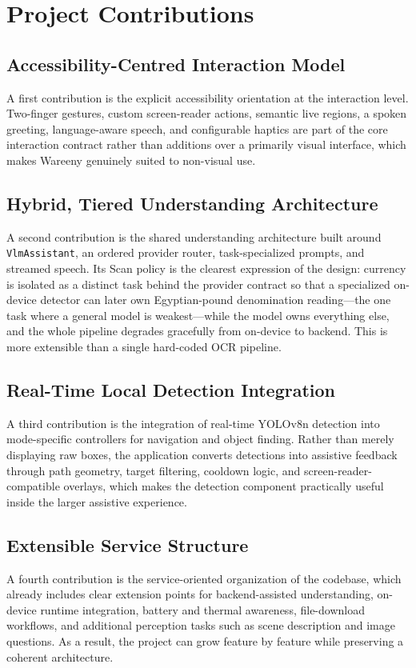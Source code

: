 \documentclass[a4paper]{report}
\begin{document}
\section{Project Contributions}
\subsection{Accessibility-Centred Interaction Model}
A first contribution is the explicit accessibility orientation at the interaction level. Two-finger gestures, custom screen-reader actions, semantic live regions, a spoken greeting, language-aware speech, and configurable haptics are part of the core interaction contract rather than additions over a primarily visual interface, which makes Wareeny genuinely suited to non-visual use.

\subsection{Hybrid, Tiered Understanding Architecture}
A second contribution is the shared understanding architecture built around \texttt{VlmAssistant}, an ordered provider router, task-specialized prompts, and streamed speech. Its Scan policy is the clearest expression of the design: currency is isolated as a distinct task behind the provider contract so that a specialized on-device detector can later own Egyptian-pound denomination reading---the one task where a general model is weakest---while the model owns everything else, and the whole pipeline degrades gracefully from on-device to backend. This is more extensible than a single hard-coded OCR pipeline.

\subsection{Real-Time Local Detection Integration}
A third contribution is the integration of real-time YOLOv8n detection into mode-specific controllers for navigation and object finding. Rather than merely displaying raw boxes, the application converts detections into assistive feedback through path geometry, target filtering, cooldown logic, and screen-reader-compatible overlays, which makes the detection component practically useful inside the larger assistive experience.

\subsection{Extensible Service Structure}
A fourth contribution is the service-oriented organization of the codebase, which already includes clear extension points for backend-assisted understanding, on-device runtime integration, battery and thermal awareness, file-download workflows, and additional perception tasks such as scene description and image questions. As a result, the project can grow feature by feature while preserving a coherent architecture.
\end{document}
